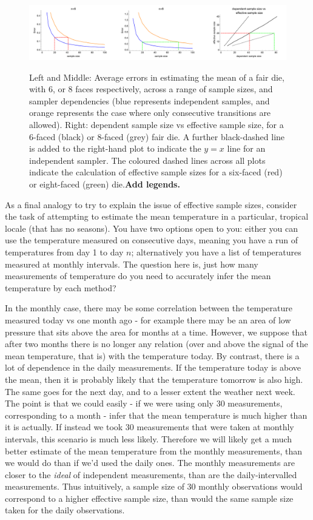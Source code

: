 \documentclass[11pt,fullpage]{book}
\begin{document}
\begin{figure}
\centering
\scalebox{0.3} 
{\includegraphics{MCMC_dependentCorrelationDie.pdf}}
\caption{Left and Middle: Average errors in estimating the mean of a fair die, with 6, or 8 faces respectively, across a range of sample sizes, and sampler dependencies (blue represents independent samples, and orange represents the case where only consecutive transitions are allowed). Right: dependent sample size vs effective sample size, for a 6-faced (black) or 8-faced (grey) fair die. A further black-dashed line is added to the right-hand plot to indicate the $y=x$ line for an independent sampler. The coloured dashed lines across all plots indicate the calculation of effective sample sizes for a six-faced (red) or eight-faced (green) die.\textbf{Add legends.}}\label{fig:MCMC_dependentCorrelationDie}
\end{figure}

As a final analogy to try to explain the issue of effective sample sizes, consider the task of attempting to estimate the mean temperature in a particular, tropical locale (that has no seasons). You have two options open to you: either you can use the temperature measured on consecutive days, meaning you have a run of temperatures from day 1 to day $n$; alternatively you have a list of temperatures measured at monthly intervals. The question here is, just how many measurements of temperature do you need to accurately infer the mean temperature by each method? 

In the monthly case, there may be some correlation between the temperature measured today vs one month ago - for example there may be an area of low pressure that sits above the area for months at a time. However, we suppose that after two months there is no longer any relation (over and above the signal of the mean temperature, that is) with the temperature today. By contrast, there is a lot of dependence in the daily measurements. If the temperature today is above the mean, then it is probably likely that the temperature tomorrow is also high. The same goes for the next day, and to a lesser extent the weather next week. The point is that we could easily - if we were using only 30 measurements, corresponding to a month - infer that the mean temperature is much higher than it is actually. If instead we took 30 measurements that were taken at monthly intervals, this scenario is much less likely. Therefore we will likely get a much better estimate of the mean temperature from the monthly measurements, than we would do than if we'd used the daily ones. The monthly measurements are closer to the \textit{ideal} of independent measurements, than are the daily-intervalled measurements. Thus intuitively, a sample size of 30 monthly observations would correspond to a higher effective sample size, than would the same sample size taken for the daily observations.
\end{document}
